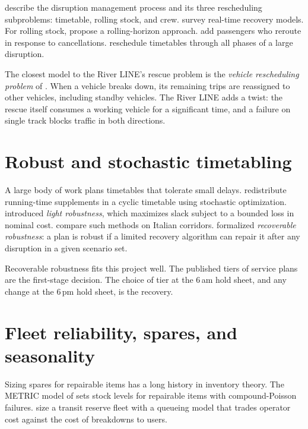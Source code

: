 \documentclass[11pt]{article}
\begin{document}
\citet{jespersengroth2009disruption} describe the disruption management process and its three rescheduling subproblems: timetable, rolling stock, and crew. \citet{cacchiani2014overview} survey real-time recovery models. For rolling stock, \citet{nielsen2012rolling} propose a rolling-horizon approach. \citet{kroon2015rescheduling} add passengers who reroute in response to cancellations. \citet{veelenturf2016railway} reschedule timetables through all phases of a large disruption.

The closest model to the River LINE's rescue problem is the \emph{vehicle rescheduling problem} of \citet{li2007vehicle}. When a vehicle breaks down, its remaining trips are reassigned to other vehicles, including standby vehicles. The River LINE adds a twist: the rescue itself consumes a working vehicle for a significant time, and a failure on single track blocks traffic in both directions.

\section{Robust and stochastic timetabling}

A large body of work plans timetables that tolerate small delays. \citet{kroon2008stochastic} redistribute running-time supplements in a cyclic timetable using stochastic optimization. \citet{fischetti2009light} introduced \emph{light robustness}, which maximizes slack subject to a bounded loss in nominal cost. \citet{fischetti2009fast} compare such methods on Italian corridors. \citet{liebchen2009concept} formalized \emph{recoverable robustness}: a plan is robust if a limited recovery algorithm can repair it after any disruption in a given scenario set.

Recoverable robustness fits this project well. The published tiers of service plans are the first-stage decision. The choice of tier at the 6\,am hold sheet, and any change at the 6\,pm hold sheet, is the recovery.

\section{Fleet reliability, spares, and seasonality}

Sizing spares for repairable items has a long history in inventory theory. The METRIC model of \citet{sherbrooke1968metric} sets stock levels for repairable items with compound-Poisson failures. \citet{hou2018optimization} size a transit reserve fleet with a queueing model that trades operator cost against the cost of breakdowns to users.
\end{document}
